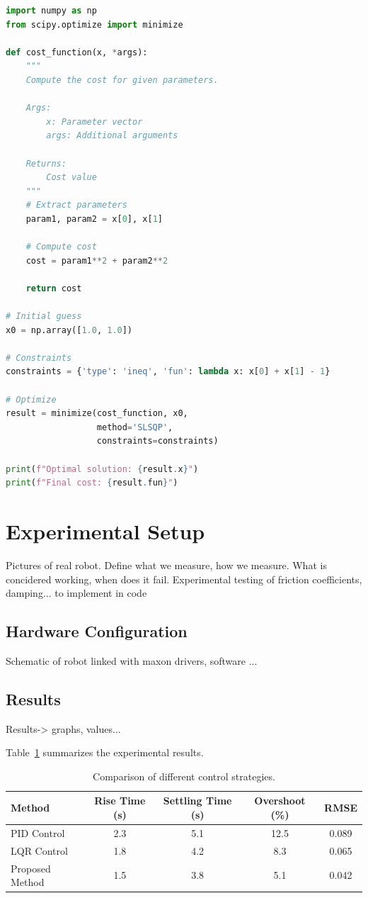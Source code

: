 \documentclass[11pt,a4paper,twoside,openright]{book}
\begin{document}
\begin{lstlisting}[language=Python, caption={Proposed optimization algorithm}, label={lst:algorithm}]
import numpy as np
from scipy.optimize import minimize

def cost_function(x, *args):
    """
    Compute the cost for given parameters.
    
    Args:
        x: Parameter vector
        args: Additional arguments
    
    Returns:
        Cost value
    """
    # Extract parameters
    param1, param2 = x[0], x[1]
    
    # Compute cost
    cost = param1**2 + param2**2
    
    return cost

# Initial guess
x0 = np.array([1.0, 1.0])

# Constraints
constraints = {'type': 'ineq', 'fun': lambda x: x[0] + x[1] - 1}

# Optimize
result = minimize(cost_function, x0, 
                  method='SLSQP',
                  constraints=constraints)

print(f"Optimal solution: {result.x}")
print(f"Final cost: {result.fun}")
\end{lstlisting}

\section{Experimental Setup}

Pictures of real robot.
Define what we measure, how we measure. What is concidered working, when does it fail. 
Experimental testing of friction coefficients, damping... to implement in code

\subsection{Hardware Configuration}

Schematic of robot linked with maxon drivers, software ...
\subsection{Results}
Results-> graphs, values...

Table~\ref{tab:results} summarizes the experimental results.

\begin{table}[htbp]
    \centering
    \caption{Comparison of different control strategies.}
    \label{tab:results}
    \begin{tabular}{@{}lcccc@{}}
        \toprule
        Method & Rise Time (s) & Settling Time (s) & Overshoot (\%) & RMSE \\
        \midrule
        PID Control & 2.3 & 5.1 & 12.5 & 0.089 \\
        LQR Control & 1.8 & 4.2 & 8.3 & 0.065 \\
        Proposed Method & 1.5 & 3.8 & 5.1 & 0.042 \\
        \bottomrule
    \end{tabular}
\end{table}
\end{document}

